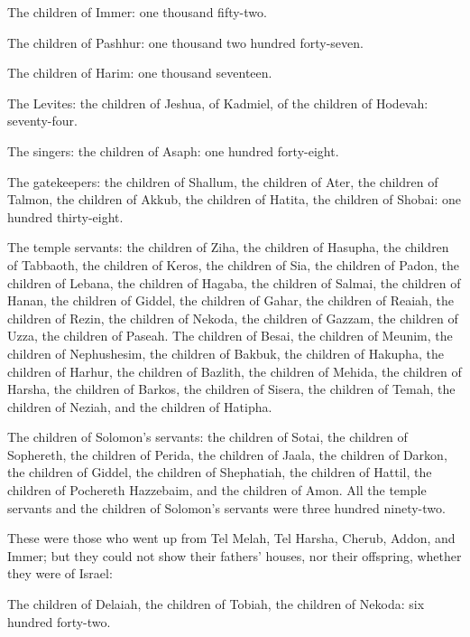 {\par }{\LI {}The children of Immer: one thousand fifty-two.
\par }{\LI {}The children of Pashhur: one thousand two hundred forty-seven.
\par }{\LI {}The children of Harim: one thousand seventeen.
\par }{\BB \par }{\LI {}The Levites: the children of Jeshua, of Kadmiel, of the children of Hodevah: seventy-four.
\par }{\LI {}The singers: the children of Asaph: one hundred forty-eight.
\par }{\LI {}The gatekeepers: the children of Shallum, the children of Ater, the children of Talmon, the children of Akkub, the children of Hatita, the children of Shobai: one hundred thirty-eight.
\par }{\PP {}The temple servants: the children of Ziha, the children of Hasupha, the children of Tabbaoth,
the children of Keros, the children of Sia, the children of Padon,
the children of Lebana, the children of Hagaba, the children of Salmai,
the children of Hanan, the children of Giddel, the children of Gahar,
the children of Reaiah, the children of Rezin, the children of Nekoda,
the children of Gazzam, the children of Uzza, the children of Paseah.
The children of Besai, the children of Meunim, the children of Nephushesim,
the children of Bakbuk, the children of Hakupha, the children of Harhur,
the children of Bazlith, the children of Mehida, the children of Harsha,
the children of Barkos, the children of Sisera, the children of Temah,
the children of Neziah, and the children of Hatipha.
\par }{\PP {}The children of Solomon’s servants: the children of Sotai, the children of Sophereth, the children of Perida,
the children of Jaala, the children of Darkon, the children of Giddel,
the children of Shephatiah, the children of Hattil, the children of Pochereth Hazzebaim, and the children of Amon.
All the temple servants and the children of Solomon’s servants were three hundred ninety-two.
\par }{\PP {}These were those who went up from Tel Melah, Tel Harsha, Cherub, Addon, and Immer; but they could not show their fathers’ houses, nor their offspring, whether they were of Israel:
\par }{\LI {}The children of Delaiah, the children of Tobiah, the children of Nekoda: six hundred forty-two.
}
